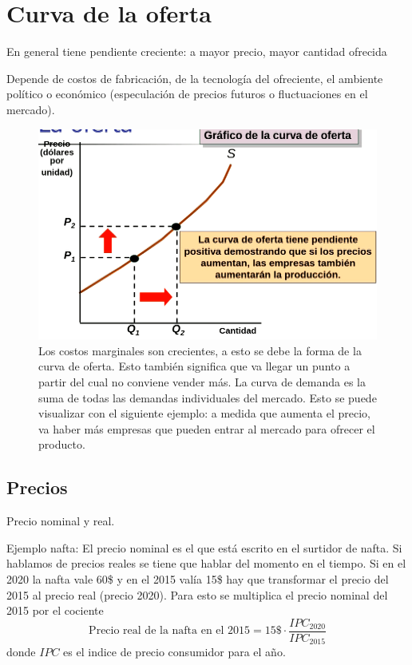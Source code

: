 \documentclass[twocolumn,10pt]{article}
\begin{document}
\section{Curva de la oferta}

En general tiene pendiente creciente: a mayor precio, mayor cantidad ofrecida

Depende de costos de fabricaci\'on, de la tecnolog\'ia del ofreciente, el ambiente político o econ\'omico (especulaci\'on de precios futuros o fluctuaciones en el mercado).

\begin{figure}[htb!]
	\centering
	\includegraphics[width=1.0\linewidth]{fig/la_oferta}
	\caption{Los costos marginales son crecientes, a esto se debe la forma de la curva de oferta. Esto tambi\'en significa que va llegar un punto a partir del cual no conviene vender m\'as. La curva de demanda es la suma de todas las demandas individuales del mercado. Esto se puede visualizar con el siguiente ejemplo: a medida que aumenta el precio, va haber m\'as empresas que pueden entrar al mercado para ofrecer el producto.}
	\label{fig:laoferta}
\end{figure}

\subsection{Precios}
Precio nominal y real.

Ejemplo nafta: El precio nominal es el que est\'a escrito en el surtidor de nafta. Si hablamos de precios reales se tiene que hablar del momento en el tiempo. Si en el 2020 la nafta vale 60\$ y en el 2015 val\'ia 15\$ hay que transformar el precio del 2015 al precio real (precio 2020). Para esto se multiplica el precio nominal del 2015 por el cociente 
\[
\text{Precio real de la nafta en el 2015}=15\$\cdot \frac{IPC_{2020}}{IPC_{2015}}
\]
donde $IPC$ es el indice de precio consumidor para el a\~no.
\end{document}
